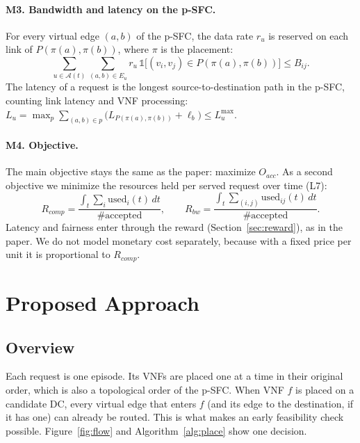 \documentclass[11pt,a4paper]{article}
\begin{document}
\paragraph{M3. Bandwidth and latency on the p-SFC.} For every virtual edge
$(a,b)$ of the p-SFC, the data rate $r_u$ is reserved on each link of
$P(\pi(a),\pi(b))$, where $\pi$ is the placement:
\begin{equation}
\sum_{u\in\mathcal{A}(t)} \sum_{(a,b)\in E_u} r_u\,
\mathbb{1}\big[(v_i,v_j)\in P(\pi(a),\pi(b))\big] \le B_{ij}.
\end{equation}
The latency of a request is the longest source-to-destination path in the
p-SFC, counting link latency and VNF processing:
$L_u = \max_{p} \sum_{(a,b)\in p} \big(L_{P(\pi(a),\pi(b))} + \ell_b\big)
\le L^{\max}_u$.

\paragraph{M4. Objective.} The main objective stays the same as the paper:
maximize $O_{acc}$. As a second objective we minimize the resources held per
served request over time (L7):
\begin{equation}
R_{comp} = \frac{\int_t \sum_i \mathrm{used}_i(t)\,dt}{\#\text{accepted}},
\qquad
R_{bw} = \frac{\int_t \sum_{(i,j)} \mathrm{used}_{ij}(t)\,dt}{\#\text{accepted}}.
\end{equation}
Latency and fairness enter through the reward (Section~\ref{sec:reward}), as in
the paper. We do not model monetary cost separately, because with a fixed price
per unit it is proportional to $R_{comp}$.

\section{Proposed Approach}\label{sec:approach}

\subsection{Overview}
Each request is one episode. Its VNFs are placed one at a time in their original
order, which is also a topological order of the p-SFC. When VNF $f$ is placed on
a candidate DC, every virtual edge that enters $f$ (and its edge to the
destination, if it has one) can already be routed. This is what makes an early
feasibility check possible. Figure~\ref{fig:flow} and Algorithm~\ref{alg:place}
show one decision.
\end{document}

